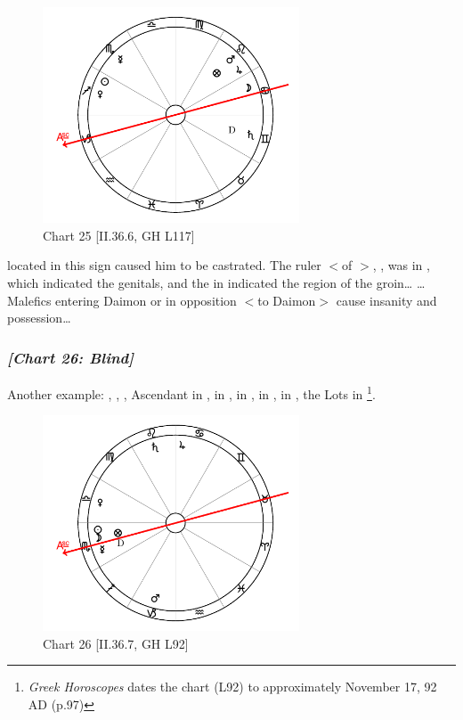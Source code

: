 \clearpage
\begin{figure}
\centering
\vspace{-20pt}
\includegraphics[width=0.68\textwidth]{charts/2_36_6}
\caption{Chart 25 [II.36.6, GH L117]}
\label{fig:chart25}
\end{figure}

\noindent \Saturn\xspace located in this sign caused him to be castrated. The ruler $<$of \Gemini$>$, \Mercury, was in \Scorpio, which indicated the genitals, and the \Sun\xspace in \Sagittarius\xspace indicated the region of the groin\ldots
\ldots Malefics entering Daimon or in opposition $<$to Daimon$>$ cause insanity and possession\ldots

\newpage
\subsubsection{\textit{[Chart 26: Blind]}}
Another example: \Sun, \Moon, \Mercury, Ascendant in \Scorpio, \Saturn\xspace in \Leo, \Jupiter\xspace in \Cancer, \Mars\xspace in \Capricorn, \Venus\xspace in \Libra, the Lots in \Scorpio
\footnote{\textit{Greek Horoscopes} dates the chart (L92) to approximately November 17, 92 AD (p.97)}. 

\clearpage
\begin{figure}
\centering
\vspace{-20pt}
\includegraphics[width=0.68\textwidth]{charts/2_36_7}
\caption{Chart 26 [II.36.7, GH L92]}
\label{fig:chart26}
\end{figure}

